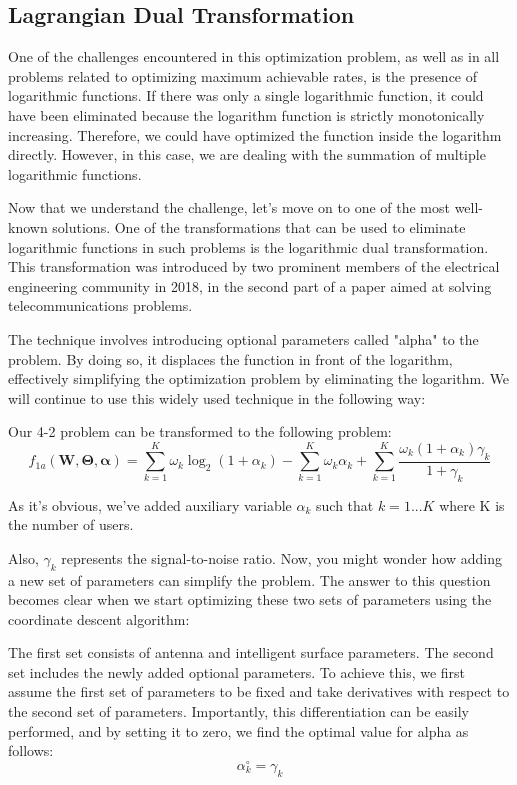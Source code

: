 \documentclass{article}
\begin{document}
\subsection{Lagrangian Dual Transformation}
One of the challenges encountered in this optimization problem, as well as in all problems related to optimizing maximum achievable rates, is the presence of logarithmic functions. If there was only a single logarithmic function, it could have been eliminated because the logarithm function is strictly monotonically increasing. Therefore, we could have optimized the function inside the logarithm directly. However, in this case, we are dealing with the summation of multiple logarithmic functions.


Now that we understand the challenge, let's move on to one of the most well-known solutions. One of the transformations that can be used to eliminate logarithmic functions in such problems is the logarithmic dual transformation. This transformation was introduced by two prominent members of the electrical engineering community in 2018, in the second part of a paper aimed at solving telecommunications problems.

The technique involves introducing optional parameters called "alpha" to the problem. By doing so, it displaces the function in front of the logarithm, effectively simplifying the optimization problem by eliminating the logarithm. We will continue to use this widely used technique in the following way:

Our 4-2 problem can be transformed to the following problem:
\[
f_{1a}(\mathbf{W}, \boldsymbol{\Theta}, \boldsymbol{\alpha}) = \sum_{k=1}^{K} \omega_k \log_2(1 + \alpha_k) - \sum_{k=1}^{K} \omega_k \alpha_k + \sum_{k=1}^{K} \frac{\omega_k (1 + \alpha_k) \gamma_k}{1 + \gamma_k}
\]

As it's obvious, we've added auxiliary variable $\alpha_k$ such that $k = 1 ... K$ where K is the number of users.

Also, $\gamma_k$ represents the signal-to-noise ratio. Now, you might wonder how adding a new set of parameters can simplify the problem. The answer to this question becomes clear when we start optimizing these two sets of parameters using the coordinate descent algorithm:

The first set consists of antenna and intelligent surface parameters.
The second set includes the newly added optional parameters.
To achieve this, we first assume the first set of parameters to be fixed and take derivatives with respect to the second set of parameters. Importantly, this differentiation can be easily performed, and by setting it to zero, we find the optimal value for alpha as follows:
\[\alpha_k^\circ = \gamma_k\]
\end{document}

